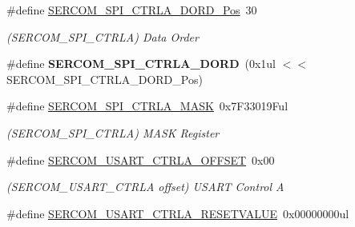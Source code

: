 \begin{DoxyCompactItemize}
\item 
\hypertarget{group___s_a_m_l21___s_e_r_c_o_m_ga6d272c34e4254de634b734f8156fde5e}{}\#define \hyperlink{group___s_a_m_l21___s_e_r_c_o_m_ga6d272c34e4254de634b734f8156fde5e}{S\+E\+R\+C\+O\+M\+\_\+\+S\+P\+I\+\_\+\+C\+T\+R\+L\+A\+\_\+\+D\+O\+R\+D\+\_\+\+Pos}~30\label{group___s_a_m_l21___s_e_r_c_o_m_ga6d272c34e4254de634b734f8156fde5e}

\begin{DoxyCompactList}\small\item\em (S\+E\+R\+C\+O\+M\+\_\+\+S\+P\+I\+\_\+\+C\+T\+R\+L\+A) Data Order \end{DoxyCompactList}\item 
\hypertarget{group___s_a_m_l21___s_e_r_c_o_m_ga6b3acc99e46e42e193fe0d4887123182}{}\#define {\bfseries S\+E\+R\+C\+O\+M\+\_\+\+S\+P\+I\+\_\+\+C\+T\+R\+L\+A\+\_\+\+D\+O\+R\+D}~(0x1ul $<$$<$ S\+E\+R\+C\+O\+M\+\_\+\+S\+P\+I\+\_\+\+C\+T\+R\+L\+A\+\_\+\+D\+O\+R\+D\+\_\+\+Pos)\label{group___s_a_m_l21___s_e_r_c_o_m_ga6b3acc99e46e42e193fe0d4887123182}

\item 
\hypertarget{group___s_a_m_l21___s_e_r_c_o_m_gac25c912959e4a0b8829189669303a212}{}\#define \hyperlink{group___s_a_m_l21___s_e_r_c_o_m_gac25c912959e4a0b8829189669303a212}{S\+E\+R\+C\+O\+M\+\_\+\+S\+P\+I\+\_\+\+C\+T\+R\+L\+A\+\_\+\+M\+A\+S\+K}~0x7\+F33019\+Ful\label{group___s_a_m_l21___s_e_r_c_o_m_gac25c912959e4a0b8829189669303a212}

\begin{DoxyCompactList}\small\item\em (S\+E\+R\+C\+O\+M\+\_\+\+S\+P\+I\+\_\+\+C\+T\+R\+L\+A) M\+A\+S\+K Register \end{DoxyCompactList}\item 
\hypertarget{group___s_a_m_l21___s_e_r_c_o_m_ga54d6a667e0cba94724a7bf58c4867180}{}\#define \hyperlink{group___s_a_m_l21___s_e_r_c_o_m_ga54d6a667e0cba94724a7bf58c4867180}{S\+E\+R\+C\+O\+M\+\_\+\+U\+S\+A\+R\+T\+\_\+\+C\+T\+R\+L\+A\+\_\+\+O\+F\+F\+S\+E\+T}~0x00\label{group___s_a_m_l21___s_e_r_c_o_m_ga54d6a667e0cba94724a7bf58c4867180}

\begin{DoxyCompactList}\small\item\em (S\+E\+R\+C\+O\+M\+\_\+\+U\+S\+A\+R\+T\+\_\+\+C\+T\+R\+L\+A offset) U\+S\+A\+R\+T Control A \end{DoxyCompactList}\item 
\hypertarget{group___s_a_m_l21___s_e_r_c_o_m_gab8c2398e33a2c2dd9c1adcdda43eebd9}{}\#define \hyperlink{group___s_a_m_l21___s_e_r_c_o_m_gab8c2398e33a2c2dd9c1adcdda43eebd9}{S\+E\+R\+C\+O\+M\+\_\+\+U\+S\+A\+R\+T\+\_\+\+C\+T\+R\+L\+A\+\_\+\+R\+E\+S\+E\+T\+V\+A\+L\+U\+E}~0x00000000ul\label{group___s_a_m_l21___s_e_r_c_o_m_gab8c2398e33a2c2dd9c1adcdda43eebd9}


\end{DoxyCompactItemize}
